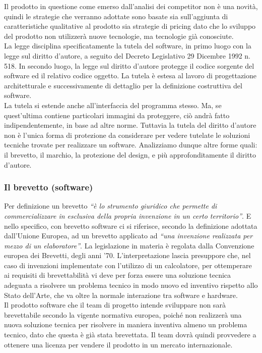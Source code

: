 Il prodotto in questione come emerso dall\textquoteright{}analisi dei competitor non è una novità, quindi le strategie che verranno adottate sono basate sia sull'aggiunta di caratteristiche qualitative al prodotto sia strategie di pricing dato che lo sviluppo del prodotto non utilizzerà nuove tecnologie, ma tecnologie già conosciute. \\
La legge disciplina specificatamente la tutela del software, in primo luogo con la legge sul diritto d'autore, a seguito del Decreto Legislativo 29 Dicembre 1992 n. 518. In secondo luogo, la legge sul diritto d'autore protegge il codice sorgente del software ed il relativo codice oggetto. La tutela è estesa al lavoro di progettazione architetturale e successivamente di dettaglio per la definizione costruttiva del software.\\
La tutela si estende anche all'interfaccia del programma stesso. Ma, se quest'ultima contiene particolari immagini da proteggere, ciò andrà fatto indipendentemente, in base ad altre norme. Tuttavia la tutela del diritto d'autore non è l'unica forma di protezione da considerare per vedere tutelate le soluzioni tecniche trovate per realizzare un software. Analizziamo dunque altre forme quali: il brevetto, il marchio, la protezione del design, e più approfonditamente il diritto d'autore.

\subsubsection{Il brevetto (software)}
Per definizione un brevetto \textit{``è lo strumento giuridico che permette di commercializzare in esclusiva della propria invenzione in un certo territorio''}. E nello specifico, con brevetto software ci si riferisce, secondo la definizione adottata dall'Unione Europea, ad un brevetto applicato ad \textit{``una invenzione realizzata per mezzo di un elaboratore''}. La legislazione in materia è regolata dalla Convenzione europea dei Brevetti, degli anni '70. L'interpretazione lascia presuppore che, nel caso di invenzioni implementate con l'utilizzo di un calcolatore, per ottemperare ai requisiti di brevettabilità vi deve per forza essere una soluzione tecnica adeguata a risolvere un problema tecnico in modo nuovo ed inventivo rispetto allo Stato dell'Arte, che va oltre la normale interazione tra software e hardware.\\
Il prodotto software che il team di progetto intende sviluppare non sarà brevettabile secondo la vigente normativa europea, poiché non realizzerà una nuova soluzione tecnica per risolvere in maniera inventiva almeno un problema tecnico, dato che questa è già stata brevettata. Il team dovrà quindi provvedere a ottenere una licenza per vendere il prodotto in un mercato internazionale. \\

